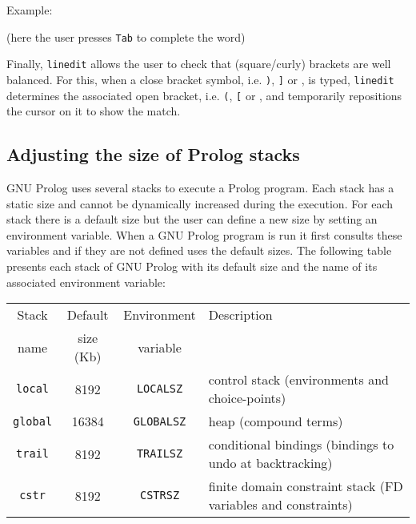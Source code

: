 Example:

\begin{CodeTwoCols}
 {(here the user presses \texttt{Tab} to complete the word)}
\SkipLine
{}
\end{CodeTwoCols}

Finally, \texttt{linedit} allows the user to check that (square/curly)
brackets are well balanced. For this, when a close bracket symbol, i.e.
\texttt{)}, \texttt{]} or \texttt{{\rb}}, is typed, \texttt{linedit} determines
the associated open bracket, i.e. \texttt{(}, \texttt{[} or \texttt{{\lb}}, and
temporarily repositions the cursor on it to show the match.

\subsection{Adjusting the size of Prolog stacks}
\label{Adjusting-the-size-of-Prolog-stacks}
GNU Prolog uses several stacks to execute a Prolog program. Each stack has a
static size and cannot be dynamically increased during the execution. For
each stack there is a default size but the user can define a new size by
setting an environment variable. When a GNU Prolog program is run it first
consults these variables and if they are not defined uses the default sizes.
The following table presents each stack of GNU Prolog with its default size
and the name of its associated environment variable:

\begin{tabular}{|c|c|c|l|}
\hline

Stack & Default   & Environment & Description \\
name  & size (Kb) & variable    & \\

\hline\hline

\texttt{local} & 8192 & \texttt{LOCALSZ} & control stack (environments
and choice-points) \\

\hline

\texttt{global} & 16384 & \texttt{GLOBALSZ} & heap (compound terms)
\\

\hline

\texttt{trail} & 8192 & \texttt{TRAILSZ} & conditional bindings (bindings
to undo at backtracking) \\

\hline

\texttt{cstr} & 8192 & \texttt{CSTRSZ} & finite domain constraint stack
(FD variables and constraints) \\

\hline
\end{tabular}


